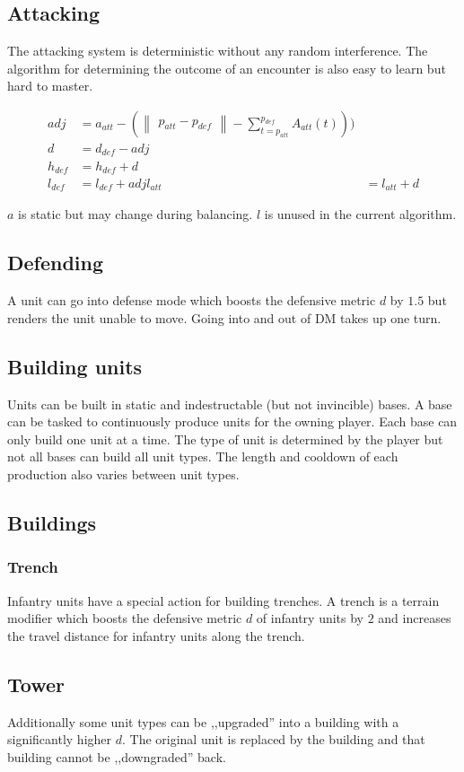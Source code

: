 \subsection{Attacking}
The attacking system is deterministic without any random interference. The algorithm for determining the outcome
of an encounter is also easy to learn but hard to master.

\begin{align}
    adj &= a_{att} - (\begin{Vmatrix}p_{att} - p_{def}\end{Vmatrix} - \sum_{t=p_{att}}^{p_{def}} A_{att}(t))) \\
    d &= d_{def} - adj \\
    h_{def} &= h_{def} + d \\
    l_{def} &= l_{def} + adj
    l_{att} &= l_{att} + d
\end{align}

$a$ is static but may change during balancing. $l$ is unused in the current algorithm.
\subsection{Defending}
A unit can go into defense mode which boosts the defensive metric $d$ by $1.5$ but renders the unit unable to move.
Going into and out of DM takes up one turn.
\subsection{Building units}
Units can be built in static and indestructable (but not invincible) bases.
A base can be tasked to continuously produce units for the owning player. Each base can only build one unit
at a time. The type of unit is determined by the player but not all bases can build all unit types. The length and cooldown
of each production also varies between unit types.
\subsection{Buildings}
\subsubsection{Trench}
Infantry units have a special action for building trenches. A trench is a terrain modifier which boosts the
defensive metric $d$ of infantry units by $2$ and increases the travel distance for infantry units along the trench.

\subsection{Tower}
Additionally some unit types can be ,,upgraded'' into a building with a significantly higher $d$. The original unit is replaced by the
building and that building cannot be ,,downgraded'' back.
